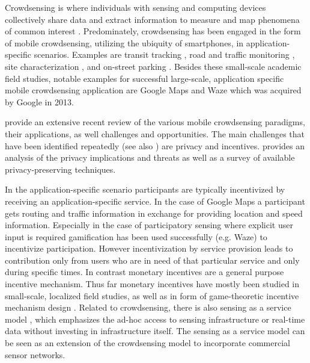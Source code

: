Crowdsensing is where individuals with sensing and computing devices collectively share data and extract information to measure and map phenomena of common interest \cite{ganti2011mobile}. Predominately, crowdsensing has been engaged in the form of mobile crowdsensing, utilizing the ubiquity of smartphones, in application-specific scenarios. Examples are transit tracking \cite{Thiagarajan:2010:CTT:1869983.1869993}, road and traffic monitoring \cite{Mohan:2008:NRM:1460412.1460444}, site characterization \cite{Chon:2012:ACP:2370216.2370288}, and on-street parking \cite{Chen:2012:COS:2386958.2386960,6569416}. Besides these small-scale academic field studies, notable examples for successful large-scale, application specific mobile crowdsensing application are Google Maps and Waze which was acquired by Google in 2013.   

\cite{guo2015mobile} provide an extensive recent review of the various mobile crowdsensing paradigms, their applications, as well challenges and opportunities. 
The main challenges that have been identified repeatedly (see also \cite{he2015privacy}) are privacy and incentives. \cite{Christin2015} provides an analysis of the privacy implications and threats as well as a survey of available privacy-preserving techniques. 

In the application-specific scenario participants are typically incentivized by receiving an application-specific service. In the case of Google Maps a participant gets routing and traffic information in exchange for providing location and speed information. Especially in the case of participatory sensing where explicit user input is required gamification \cite{Deterding:2011:GDE:2181037.2181040} has been used successfully (e.g. Waze) to incentivize participation. However incentivization by service provision leads to contribution only from users who are in need of that particular service and only during specific times. In contrast monetary incentives are a general purpose incentive mechanism. Thus far monetary incentives have mostly been studied in small-scale, localized field studies, as well as in form of game-theoretic incentive mechanism design \cite{7101300}. 
Related to crowdsensing, there is also sensing as a service model \cite{Sheng:2013cm,ETT:ETT2704}, which emphasizes the ad-hoc access to sensing infrastructure or real-time data without investing in infrastructure itself. The sensing as a service model can be seen as an extension of the crowdsensing model to incorporate commercial sensor networks.

